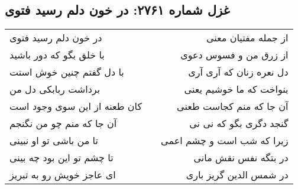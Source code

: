 \begin{center}
\section*{غزل شماره ۲۷۶۱: در خون دلم رسید فتوی}
\label{sec:2761}
\begin{longtable}{l p{0.5cm} r}
در خون دلم رسید فتوی
&&
از جمله مفتیان معنی
\\
با خلق بگو که دور باشید
&&
از زرق من و فسوس دعوی
\\
با دل گفتم چنین خوش استت
&&
دل نعره زنان که آری آری
\\
برداشت ربابکی دل من
&&
بنواخت که ما خوشیم یعنی
\\
کان طعنه از این سوی وجود است
&&
آن جا که منم کجاست طعنی
\\
آن جا که منم چو من نگنجم
&&
گنجد دگری بگو که نی نی
\\
تا من باشی تو او نبینی
&&
زیرا که شب است و چشم اعمی
\\
تا چشم تو این بود چه بینی
&&
در بتگه نفس نقش مانی
\\
ای عاجز خویش رو به تبریز
&&
در شمس الدین گریز باری
\\
\end{longtable}
\end{center}

